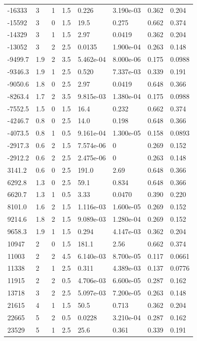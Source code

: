 \documentclass[preview]{standalone}
\begin{document}
{{\begin{tabular}{L{1.2cm}C{1.2cm} C{0.3cm}C{0.5cm} C{1.4cm}C{1.4cm} C{1.4cm}C{1.4cm}}
  -16333  &     3  & 1     & 1.5 &  0.226  & 3.190e-03  & 0.362 &  0.204   \\ 
  -15592  &     3  & 0     & 1.5 &  19.5  & 0.275  & 0.662 &  0.374   \\ 
  -14329  &     3  & 1     & 1.5 &  2.97  & 0.0419  & 0.362 &  0.204   \\ 
  -13052  &     3  & 2     & 2.5 &  0.0135  & 1.900e-04  & 0.263 &  0.148   \\ 
  -9499.7  &   1.9  & 2     & 3.5 &  5.462e-04  & 8.000e-06  & 0.175 &  0.0988   \\ 
  -9346.3  &   1.9  & 1     & 2.5 &  0.520  & 7.337e-03  & 0.339 &  0.191   \\ 
  -9050.6  &   1.8  & 0     & 2.5 &  2.97  & 0.0419  & 0.648 &  0.366   \\ 
  -8263.4  &   1.7  & 2     & 3.5 &  9.815e-03  & 1.380e-04  & 0.175 &  0.0988   \\ 
  -7552.5  &   1.5  & 0     & 1.5 &  16.4  & 0.232  & 0.662 &  0.374   \\ 
  -4246.7  &   0.8  & 0     & 2.5 &  14.0  & 0.198  & 0.648 &  0.366   \\ 
  -4073.5  &   0.8  & 1     & 0.5 &  9.161e-04  & 1.300e-05  & 0.158 &  0.0893   \\ 
  -2917.3  &   0.6  & 2     & 1.5 &  7.574e-06  & 0  & 0.269 &  0.152   \\ 
  -2912.2  &   0.6  & 2     & 2.5 &  2.475e-06  & 0  & 0.263 &  0.148   \\ 
  3141.2  &   0.6  & 0     & 2.5 &  191.0  & 2.69  & 0.648 &  0.366   \\ 
  6292.8  &   1.3  & 0     & 2.5 &  59.1  & 0.834  & 0.648 &  0.366   \\ 
  6620.7  &   1.3  & 1     & 0.5 &  3.33  & 0.0470  & 0.390 &  0.220   \\ 
  8101.0  &   1.6  & 2     & 1.5 &  1.116e-03  & 1.600e-05  & 0.269 &  0.152   \\ 
  9214.6  &   1.8  & 2     & 1.5 &  9.089e-03  & 1.280e-04  & 0.269 &  0.152   \\ 
  9658.3  &   1.9  & 1     & 1.5 &  0.294  & 4.147e-03  & 0.362 &  0.204   \\ 
  10947  &     2  & 0     & 1.5 &  181.1  & 2.56  & 0.662 &  0.374   \\ 
  11003  &     2  & 2     & 4.5 &  6.140e-03  & 8.700e-05  & 0.117 &  0.0661   \\ 
  11338  &     2  & 1     & 2.5 &  0.311  & 4.389e-03  & 0.137 &  0.0776   \\ 
  11915  &     2  & 2     & 0.5 &  4.706e-03  & 6.600e-05  & 0.287 &  0.162   \\ 
  13718  &     3  & 2     & 2.5 &  5.097e-03  & 7.200e-05  & 0.263 &  0.148   \\ 
  21615  &     4  & 1     & 1.5 &  50.5  & 0.713  & 0.362 &  0.204   \\ 
  22665  &     5  & 2     & 0.5 &  0.0228  & 3.210e-04  & 0.287 &  0.162   \\ 
  23529  &     5  & 1     & 2.5 &  25.6  & 0.361  & 0.339 &  0.191   \\ 
\hline 
\end{tabular} 

}}
\end{document}
